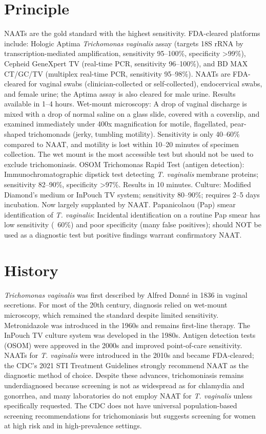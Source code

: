 \section*{Principle}
NAATs are the gold standard with the highest sensitivity. FDA-cleared platforms include: Hologic Aptima \textit{Trichomonas vaginalis} assay (targets 18S rRNA by transcription-mediated amplification, sensitivity 95--100\%, specificity >99\%), Cepheid GeneXpert TV (real-time PCR, sensitivity 96--100\%), and BD MAX CT/GC/TV (multiplex real-time PCR, sensitivity 95--98\%). NAATs are FDA-cleared for vaginal swabs (clinician-collected or self-collected), endocervical swabs, and female urine; the Aptima assay is also cleared for male urine. Results available in 1--4 hours. Wet-mount microscopy: A drop of vaginal discharge is mixed with a drop of normal saline on a glass slide, covered with a coverslip, and examined immediately under 400x magnification for motile, flagellated, pear-shaped trichomonads (jerky, tumbling motility). Sensitivity is only 40--60\% compared to NAAT, and motility is lost within 10--20 minutes of specimen collection. The wet mount is the most accessible test but should not be used to exclude trichomoniasis. OSOM Trichomonas Rapid Test (antigen detection): Immunochromatographic dipstick test detecting \textit{T. vaginalis} membrane proteins; sensitivity 82--90\%, specificity >97\%. Results in 10 minutes. Culture: Modified Diamond's medium or InPouch TV system; sensitivity 80--90\%; requires 2--5 days incubation. Now largely supplanted by NAAT. Papanicolaou (Pap) smear identification of \textit{T. vaginalis}: Incidental identification on a routine Pap smear has low sensitivity (~60\%) and poor specificity (many false positives); should NOT be used as a diagnostic test but positive findings warrant confirmatory NAAT.

\section*{History}
\textit{Trichomonas vaginalis} was first described by Alfred Donné in 1836 in vaginal secretions. For most of the 20th century, diagnosis relied on wet-mount microscopy, which remained the standard despite limited sensitivity. Metronidazole was introduced in the 1960s and remains first-line therapy. The InPouch TV culture system was developed in the 1980s. Antigen detection tests (OSOM) were approved in the 2000s and improved point-of-care sensitivity. NAATs for \textit{T. vaginalis} were introduced in the 2010s and became FDA-cleared; the CDC's 2021 STI Treatment Guidelines strongly recommend NAAT as the diagnostic method of choice. Despite these advances, trichomoniasis remains underdiagnosed because screening is not as widespread as for chlamydia and gonorrhea, and many laboratories do not employ NAAT for \textit{T. vaginalis} unless specifically requested. The CDC does not have universal population-based screening recommendations for trichomoniasis but suggests screening for women at high risk and in high-prevalence settings.

